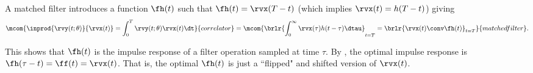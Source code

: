 A matched filter introduces a function $\fh(t)$ such that
$\fh(t) =\rvx(T-t)$ (which implies $\rvx(t)=h(T-t)$) giving
  \[
    \mcom{\inprod{\rvy(t;\theta)}{\rvx(t)} = \int_0^T \rvy(t;\theta)\rvx(t)\dt }
         {correlator}
    =
    \mcom{\brlr{\int_0^\infty \rvx(\tau)h(t-\tau)\dtau}_{t=T}
            = \brlr{\rvx(t)\conv \fh(t)}_{t=T}
         }{matched filter}.
  \]

This shows that $\fh(t)$ is the impulse response of a filter operation
sampled at time $\tau$. %
By , the optimal impulse response is
$\fh(\tau-t)=\ff(t)=\rvx(t)$.
That is, the optimal $\fh(t)$ is just a ``flipped" and shifted version of $\rvx(t)$.




